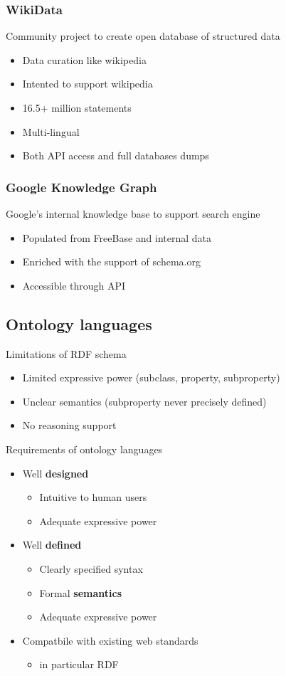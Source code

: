 \subsubsection{WikiData}
Community project to create open database of structured data
\begin{itemize}
\item Data curation like wikipedia
\item Intented to support wikipedia
\item 16.5+ million statements
\item Multi-lingual
\item Both API access and full databases dumps
\end{itemize}

\subsubsection{Google Knowledge Graph}
Google's internal knowledge base to support search engine
\begin{itemize}
\item Populated from FreeBase and internal data
\item Enriched with the support of schema.org
\item Accessible through API
\end{itemize}

\subsection{Ontology languages}
Limitations of RDF schema
\begin{itemize}
\item Limited expressive power (subclass, property, subproperty)
\item Unclear semantics (subproperty never precisely defined)
\item No reasoning support
\end{itemize}

Requirements of ontology languages
\begin{itemize}
\item Well \textbf{designed}
  \begin{itemize}
  \item Intuitive to human users
  \item Adequate expressive power
  \end{itemize}
\item Well \textbf{defined}
  \begin{itemize}
  \item Clearly specified syntax
  \item Formal \textbf{semantics}
  \item Adequate expressive power
  \end{itemize}
\item Compatbile with existing web standards
  \begin{itemize}
  \item in particular RDF
  \end{itemize}
\end{itemize}

